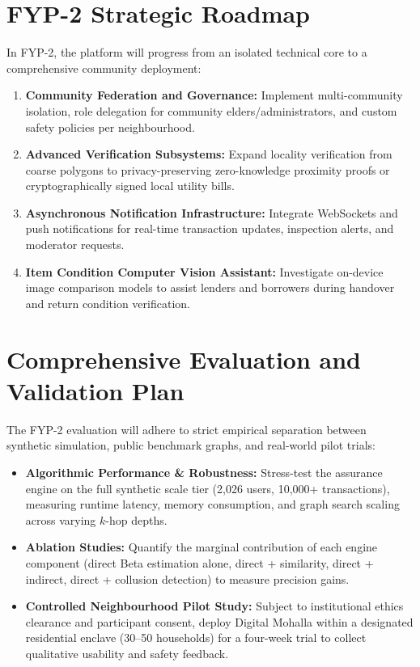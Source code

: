 \section{FYP-2 Strategic Roadmap}
In FYP-2, the platform will progress from an isolated technical core to a comprehensive community deployment:
\begin{enumerate}
    \item \textbf{Community Federation and Governance:} Implement multi-community isolation, role delegation for community elders/administrators, and custom safety policies per neighbourhood.
    \item \textbf{Advanced Verification Subsystems:} Expand locality verification from coarse polygons to privacy-preserving zero-knowledge proximity proofs or cryptographically signed local utility bills.
    \item \textbf{Asynchronous Notification Infrastructure:} Integrate WebSockets and push notifications for real-time transaction updates, inspection alerts, and moderator requests.
    \item \textbf{Item Condition Computer Vision Assistant:} Investigate on-device image comparison models to assist lenders and borrowers during handover and return condition verification.
\end{enumerate}

\section{Comprehensive Evaluation and Validation Plan}
The FYP-2 evaluation will adhere to strict empirical separation between synthetic simulation, public benchmark graphs, and real-world pilot trials:
\begin{itemize}
    \item \textbf{Algorithmic Performance \& Robustness:} Stress-test the assurance engine on the full synthetic scale tier (2,026 users, 10,000+ transactions), measuring runtime latency, memory consumption, and graph search scaling across varying $k$-hop depths.
    \item \textbf{Ablation Studies:} Quantify the marginal contribution of each engine component (direct Beta estimation alone, direct + similarity, direct + indirect, direct + collusion detection) to measure precision gains.
    \item \textbf{Controlled Neighbourhood Pilot Study:} Subject to institutional ethics clearance and participant consent, deploy Digital Mohalla within a designated residential enclave (30--50 households) for a four-week trial to collect qualitative usability and safety feedback.
\end{itemize}
